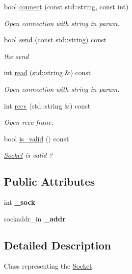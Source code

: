 \begin{DoxyCompactItemize}
bool \hyperlink{class_socket_a33302b899ea60cce8ed98ba5a187c3f0}{connect} (const std\+::string, const int)
\begin{DoxyCompactList}\small\item\em Open connection with string in param. \end{DoxyCompactList}\item 
bool \hyperlink{class_socket_a26f80b1f9440bc48f0df6e9dd0a20c03}{send} (const std\+::string) const
\begin{DoxyCompactList}\small\item\em the send \end{DoxyCompactList}\item 
int \hyperlink{class_socket_a6e655e03426daad8ab34489ccf1860ff}{read} (std\+::string \&) const
\begin{DoxyCompactList}\small\item\em Open connection with string in param. \end{DoxyCompactList}\item 
int \hyperlink{class_socket_aba586befe39d7c3f48ef1ea8c777be53}{recv} (std\+::string \&) const
\begin{DoxyCompactList}\small\item\em Open recv franc. \end{DoxyCompactList}\item 
bool \hyperlink{class_socket_aa1bf03020dfad0037edc66f8833f106b}{is\+\_\+valid} () const
\begin{DoxyCompactList}\small\item\em \hyperlink{class_socket}{Socket} is valid ? \end{DoxyCompactList}\end{DoxyCompactItemize}
\subsection*{Public Attributes}
\begin{DoxyCompactItemize}
\item 
\mbox{\label{class_socket_a3a4668ad89c1060dffcc895dbe382697}} 
int {\bfseries \+\_\+sock}
\item 
\mbox{\label{class_socket_a9bf139a6579ffb01153fc2eb07cc45ea}} 
sockaddr\+\_\+in {\bfseries \+\_\+addr}
\end{DoxyCompactItemize}


\subsection{Detailed Description}
Class representing the \hyperlink{class_socket}{Socket}. 

